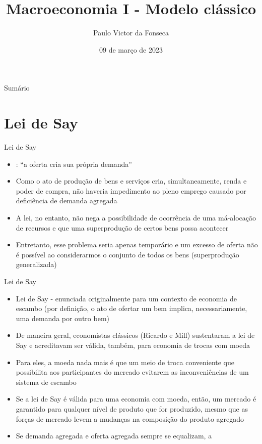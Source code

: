 \documentclass[10pt]{beamer}
\title[]{Macroeconomia I - Modelo clássico}
\author[]{Paulo Victor da Fonseca}
\date{09 de março de 2023}
\begin{document}
\begin{frame}[plain]
\end{frame}

\begin{frame}{Sumário}
    \tableofcontents
\end{frame}

\section{Lei de Say}
\begin{frame}
    {Lei de Say}
    \begin{itemize}
        \item {}: ``a oferta cria sua própria demanda'' \bigskip
        \item Como o ato de produção de bens e serviços cria, simultaneamente, renda e poder de compra, não haveria impedimento ao pleno emprego causado por deficiência de demanda agregada\bigskip
        \item A lei, no entanto, não nega a possibilidade de ocorrência de uma má-alocação de recursos e que uma superprodução de certos bens possa acontecer\bigskip
        \item Entretanto, esse problema seria apenas temporário e um excesso de oferta não é possível ao considerarmos o conjunto de todos os bens (superprodução generalizada) 
    \end{itemize}
\end{frame}

\begin{frame}
    {Lei de Say}
    \begin{itemize}
        \item Lei de Say - enunciada originalmente para um contexto de economia de escambo (por definição, o ato de ofertar um bem implica, necessariamente, uma demanda por outro bem)\bigskip
        \item De maneira geral, economistas clássicos (Ricardo e Mill) sustentaram a lei de Say e acreditavam ser válida, também, para economia de trocas com moeda\bigskip
        \item Para eles, a moeda nada mais é que um meio de troca conveniente que possibilita aos participantes do mercado evitarem as inconveniências de um sistema de escambo\bigskip
        \item Se a lei de Say é válida para uma economia com moeda, então, um mercado é garantido para qualquer nível de produto que for produzido, mesmo que as forças de mercado levem a mudanças na composição do produto agregado\bigskip
        \item Se demanda agregada e oferta agregada sempre se equalizam, a 
    \end{itemize}
\end{frame}
\end{document}
